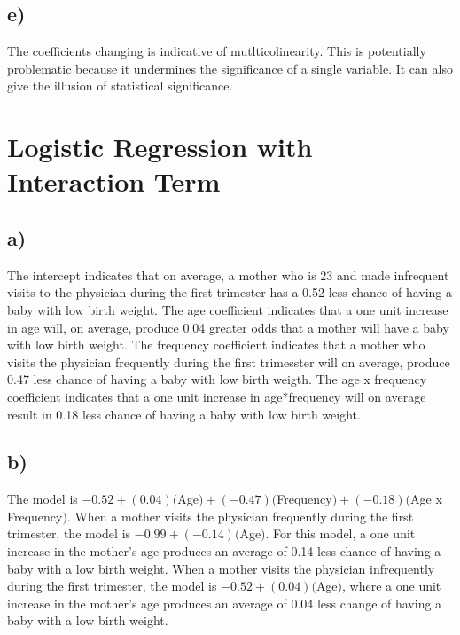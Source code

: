\documentclass[12pt, letterpaper]{article}
\begin{document}
\subsection*{e)} The coefficients changing is indicative of mutlticolinearity. This is potentially problematic because it undermines the significance of a single variable. It can also give the illusion of statistical significance.

\newpage
\section{Logistic Regression with Interaction Term}
\subsection*{a)} The intercept indicates that on average, a mother who is 23 and made infrequent visits to the physician during the first trimester has a 0.52 less chance of having a baby with low birth weight. The age coefficient indicates that a one unit increase in age will, on average, produce 0.04 greater odds that a mother will have a baby with low birth weight. The frequency coefficient indicates that a mother who visits the physician frequently during the first trimesster will on average, produce 0.47 less chance of having a baby with low birth weigth. The age x frequency coefficient indicates that a one unit increase in age*frequency will on average result in 0.18 less chance of having a baby with low birth weight.

\subsection*{b)} The model is $-0.52+(0.04)($Age$)+(-0.47)($Frequency$)+(-0.18)($Age x Frequency$)$. When a mother visits the physician frequently during the first trimester, the model is $-0.99 + (-0.14)($Age$)$. For this model, a one unit increase in the mother's age produces an average of 0.14 less chance of having a baby with a low birth weight. When a mother visits the physician infrequently during the first trimester, the model is $-0.52 + (0.04)($Age$)$, where a one unit increase in the mother's age produces an average of 0.04 less change of having a baby with a low birth weight.
\end{document}
